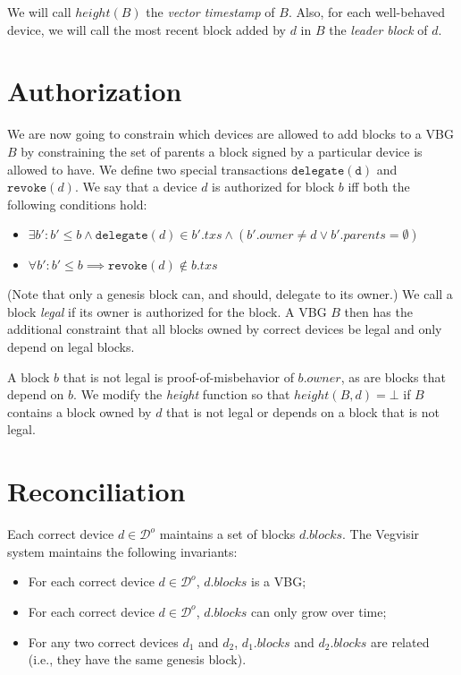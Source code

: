 \documentclass{article}
\begin{document}
We will call $\mathit{height}(B)$ the \emph{vector timestamp} of $B$.
Also, for each well-behaved device, we will call the most recent block added by $d$ in $B$ the
\emph{leader block} of $d$.

\section{Authorization}

We are now going to constrain which devices are allowed to add blocks to a VBG $B$ by constraining
the set of parents a block signed by a particular device is allowed to have.
We define two special transactions $\mathtt{delegate(d)}$ and $\mathtt{revoke}(d)$.
We say that a device $d$ is authorized for block $b$ iff both the following
conditions hold:
\begin{itemize}
\item $\exists b': b' \leq b \wedge \mathtt{delegate}(d) \in b'.\mathit{txs} \wedge (b'.\mathit{owner} \ne d \vee b'.\mathit{parents} = \emptyset)$
\item $\forall b': b' \leq b \implies \mathtt{revoke}(d) \notin b.\mathit{txs}$
\end{itemize}
(Note that only a genesis block can, and should, delegate to its owner.)
We call a block \emph{legal} if its owner is authorized for the block.
A VBG $B$ then has the additional constraint that all blocks owned by correct devices be legal and
only depend on legal blocks.

A block $b$ that is not legal is proof-of-misbehavior of $b.\mathit{owner}$,
as are blocks that depend on $b$.
We modify the \textit{height} function so
that $\mathit{height}(B, d) = \bot$ if $B$ contains a block owned by $d$ that is not legal
or depends on a block that is not legal.

\section{Reconciliation}

Each correct device $d \in \mathcal{D}^o$ maintains a set of blocks $d.\mathit{blocks}$.
The Vegvisir system maintains the following invariants:

\begin{itemize}
\item For each correct device $d \in \mathcal{D}^o$, $d.\mathit{blocks}$ is a VBG;
\item For each correct device $d \in \mathcal{D}^o$, $d.\mathit{blocks}$ can only grow over time;
\item For any two correct devices $d_1$ and $d_2$, $d_1.\mathit{blocks}$ and $d_2.\mathit{blocks}$ are related (i.e., they have the same genesis block).
\end{itemize}
\end{document}
